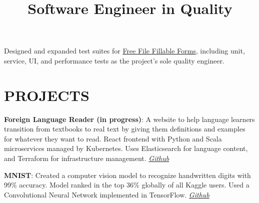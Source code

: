 \documentclass[margin]{res}
\begin{document}
\begin{resume}
\title{\textbf{Software Engineer in Quality}}
\begin{position}
Designed and expanded test suites for \href{https://www.freefilefillableforms.com}{Free File Fillable Forms}, including unit, service, UI, and performance tests as the project's sole quality engineer.
\end{position}

\section{PROJECTS}

\par
\textbf{Foreign Language Reader (in progress)}:
A website to help language learners transition from textbooks to real text by giving them definitions and examples for whatever they want to read. React frontend with Python and Scala microservices managed by Kubernetes. Uses Elasticsearch for language content, and Terraform for infrastructure management. \textit{\href{https://github.com/foreign-language-reader/api}{Github}}

\par
\textbf{MNIST}:
Created a computer vision model to recognize handwritten digits with 99\% accuracy. Model ranked in the top 36\% globally of all Kaggle users. Used a Convolutional Neural Network implemented in TensorFlow. \textit{\href{https://github.com/lucaskjaero/MNIST}{Github}}





\end{resume}
\end{document}
